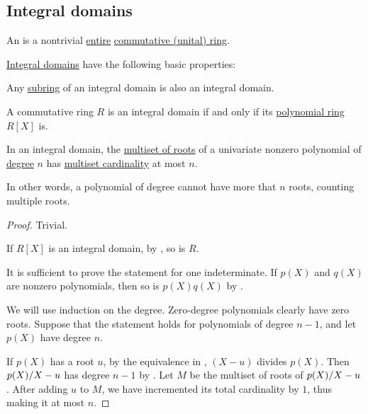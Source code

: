 \subsection{Integral domains}\label{subsec:integral_domains}

\begin{definition}\label{def:integral_domain}
  An  is a nontrivial \hyperref[def:entire_semiring]{entire} \hyperref[def:ring/commutative]{commutative (unital) ring}.
\end{definition}

\begin{proposition}\label{thm:def:integral_domain}
  \hyperref[def:integral_domain]{Integral domains} have the following basic properties:
  \begin{thmenum}
     Any \hyperref[def:ring/submodel]{subring} of an integral domain is also an integral domain.

     A commutative ring \( R \) is an integral domain if and only if its \hyperref[def:polynomial_algebra]{polynomial ring} \( R[X] \) is.

     In an integral domain, the \hyperref[def:polynomial_root]{multiset of roots} of a univariate nonzero polynomial of \hyperref[def:polynomial_degree]{degree} \( n \) has \hyperref[def:labeled_set/multiset]{multiset cardinality} at most \( n \).

    In other words, a polynomial of degree cannot have more that \( n \) roots, counting multiple roots.
  \end{thmenum}
\end{proposition}
\begin{proof}
   Trivial.


  \NecessitySubProof* If \( R[X] \) is an integral domain, by , so is \( R \).

  \SufficiencySubProof* It is sufficient to prove the statement for one indeterminate. If \( p(X) \) and \( q(X) \) are nonzero polynomials, then so is \( p(X) q(X) \) by .

   We will use induction on the degree. Zero-degree polynomials clearly have zero roots. Suppose that the statement holds for polynomials of degree \( n - 1 \), and let \( p(X) \) have degree \( n \).

  If \( p(X) \) has a root \( u \), by the equivalence in , \( (X - u) \) divides \( p(X) \). Then \( \ifrac {p(X)} {X - u} \) has degree \( n - 1 \) by . Let \( M \) be the multiset of roots of \( \ifrac {p(X)} {X - u} \). After adding \( u \) to \( M \), we have incremented its total cardinality by \( 1 \), thus making it at most \( n \).
\end{proof}

